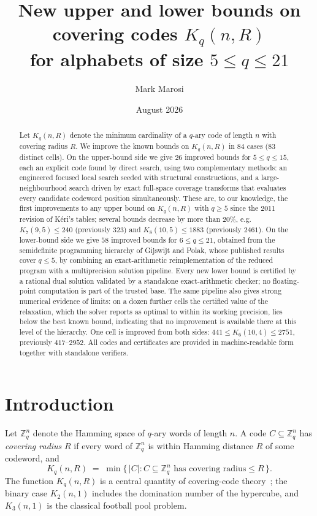 \documentclass[11pt]{amsart}
\title[New bounds on covering codes for $5\le q\le 21$]{New upper and lower
bounds on covering codes $K_q(n,R)$\\ for alphabets of size $5\le q\le 21$}
\author{Mark Marosi}
\date{August 2026}
\newcommand{\Kq}[3]{K_{#1}(#2,#3)}
\newcommand{\Zq}{\mathbb{Z}_q}
\begin{document}
\begin{abstract}
Let $K_q(n,R)$ denote the minimum cardinality of a $q$-ary code of length
$n$ with covering radius $R$. We improve the known bounds on $K_q(n,R)$ in
$84$ cases ($83$ distinct cells). On the upper-bound side we give $26$
improved bounds for $5\le q\le 15$, each an explicit code found by direct
search, using two complementary methods: an
engineered
focused local search seeded with structural constructions, and a
large-neighbourhood search driven by exact full-space coverage transforms
that evaluates every candidate codeword position simultaneously. These are,
to our knowledge, the first improvements to any upper bound on $K_q(n,R)$
with $q\ge 5$ since the 2011 revision of K\'eri's tables; several bounds
decrease by more than $20\%$, e.g.\ $\Kq{7}{9}{5}\le 240$ (previously
$323$) and $\Kq{8}{10}{5}\le 1883$ (previously $2461$). On the lower-bound
side we give $58$ improved bounds for $6\le q\le 21$, obtained from the
semidefinite programming hierarchy of Gijswijt and Polak, whose published
results cover $q\le 5$, by combining an exact-arithmetic reimplementation
of the reduced program with a multiprecision solution pipeline. Every new
lower bound is certified by a rational dual solution validated by a
standalone exact-arithmetic checker; no floating-point computation is part
of the trusted base. The same pipeline also gives strong numerical
evidence of limits: on a dozen further cells the certified value of the
relaxation, which the solver reports as optimal to within its working
precision, lies below the best known bound, indicating that no improvement
is available there at this level of the hierarchy. One cell is improved
from both sides:
$441\le \Kq{6}{10}{4}\le 2751$, previously $417$--$2952$. All codes and
certificates are provided in machine-readable form together with standalone
verifiers.
\end{abstract}

\maketitle

\section{Introduction}

Let $\Zq^n$ denote the Hamming space of $q$-ary words of length $n$. A code
$C\subseteq \Zq^n$ has \emph{covering radius} $R$ if every word of $\Zq^n$
is within Hamming distance $R$ of some codeword, and
\[
K_q(n,R) \;=\; \min\{\,|C| : C\subseteq \Zq^n \text{ has covering radius}
\le R\,\}.
\]
The function $K_q(n,R)$ is a central quantity of covering-code
theory~\cite{CHLL}; the binary case $K_2(n,1)$ includes the domination
number of the hypercube, and $K_3(n,1)$ is the classical football pool
problem.
\end{document}
